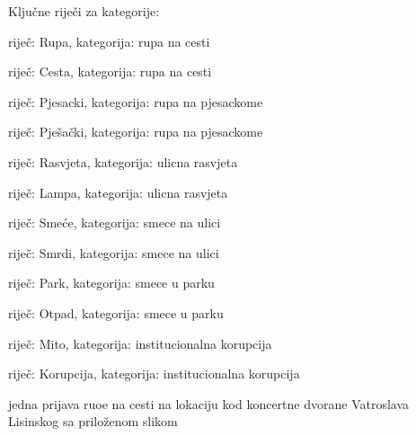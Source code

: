 \begin{packed_item}
\begin{packed_item}
				\end{packed_item}
				\item Ključne riječi za kategorije:
				\begin{packed_item}
					\item riječ: Rupa, kategorija: rupa na cesti
					\item riječ: Cesta, kategorija: rupa na cesti
					\item riječ: Pjesacki, kategorija: rupa na pjesackome
					\item riječ: Pješački, kategorija: rupa na pjesackome
					\item riječ: Rasvjeta, kategorija: ulicna rasvjeta
					\item riječ: Lampa, kategorija: ulicna rasvjeta
					\item riječ: Smeće, kategorija: smece na ulici
					\item riječ: Smrdi, kategorija: smece na ulici
					\item riječ: Park, kategorija: smece u parku
					\item riječ: Otpad, kategorija: smece u parku
					\item riječ: Mito, kategorija: institucionalna korupcija
					\item riječ: Korupcija, kategorija: institucionalna korupcija
				\end{packed_item}
				\item jedna prijava ruoe na cesti na lokaciju kod koncertne dvorane Vatroslava Lisinskog sa priloženom slikom
			\end{packed_item}
			
			\eject 